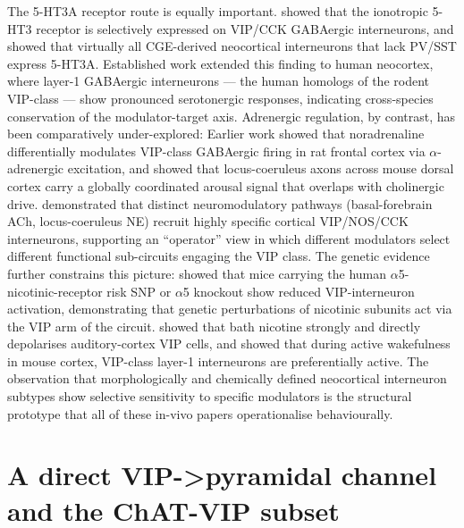 \documentclass[11pt]{article}
\begin{document}
The 5-HT3A receptor route is equally important. \citet{Ferezou2002} showed that the ionotropic 5-HT3 receptor is selectively expressed on VIP/CCK GABAergic interneurons, and \citet{Lee2010} showed that virtually all CGE-derived neocortical interneurons that lack PV/SST express 5-HT3A. Established work \citep{Poorthuis2018} extended this finding to human neocortex, where layer-1 GABAergic interneurons --- the human homologs of the rodent VIP-class --- show pronounced serotonergic responses, indicating cross-species conservation of the modulator-target axis. Adrenergic regulation, by contrast, has been comparatively under-explored: Earlier work \citep{Kawaguchi1998} showed that noradrenaline differentially modulates VIP-class GABAergic firing in rat frontal cortex via $\alpha$-adrenergic excitation, and \citet{Collins2023} showed that locus-coeruleus axons across mouse dorsal cortex carry a globally coordinated arousal signal that overlaps with cholinergic drive. \citet{Lecrux2016} demonstrated that distinct neuromodulatory pathways (basal-forebrain ACh, locus-coeruleus NE) recruit highly specific cortical VIP/NOS/CCK interneurons, supporting an ``operator'' view in which different modulators select different functional sub-circuits engaging the VIP class. The genetic evidence further constrains this picture: \citet{Koukouli2017} showed that mice carrying the human $\alpha$5-nicotinic-receptor risk SNP or $\alpha$5 knockout show reduced VIP-interneuron activation, demonstrating that genetic perturbations of nicotinic subunits act via the VIP arm of the circuit. \citet{Askew2019} showed that bath nicotine strongly and directly depolarises auditory-cortex VIP cells, and \citet{Munoz2017} showed that during active wakefulness in mouse cortex, VIP-class layer-1 interneurons are preferentially active. The \citet{Kawaguchi1997b} observation that morphologically and chemically defined neocortical interneuron subtypes show selective sensitivity to specific modulators is the structural prototype that all of these in-vivo papers operationalise behaviourally.

\section{A direct VIP-\textgreater pyramidal channel and the ChAT-VIP subset}
\end{document}
